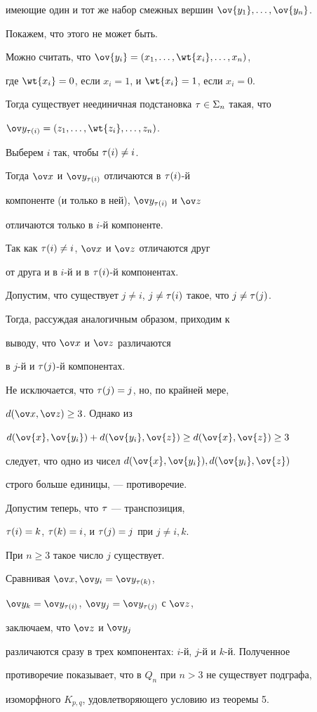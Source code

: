 \begin{exam}
имеющие один и тот же набор смежных вершин $\ov {y_1},\dotsc , \ov {y_n}$.


Покажем, что этого не может быть.


Можно считать, что $\ov{y_i}=(x_1,\dotsc ,\wt {x_i},\dotsc , x_n)$,


где $\wt {x_i}=0$, если $x_i=1$, и $\wt {x_i}=1$, если $x_i=0$.


Тогда существует неединичная подстановка $\tau\in\Sigma_n$ такая, что


$\ov y_{\t (i)}=(z_1,\dotsc ,\wt {z_i},\dotsc , z_n)$. 


Выберем $i$ так, чтобы $\tau (i)\neq i$. 


Тогда $\ov x$ и $\ov y_{\t (i)}$ отличаются в $\tau (i)$-й


компоненте (и только в ней), $\ov y_{\t (i)}$ и $\ov z$ 


отличаются только в $i$-й компоненте.


Так как $\tau (i)\neq i$, $\ov x$ и $\ov z$ отличаются друг 


от друга и в $i$-й и в $\tau (i)$-й компонентах.


Допустим, что существует $j\neq i$, $j\neq \tau (i)$ такое, что $j\neq \tau (j)$.


Тогда, рассуждая аналогичным образом, приходим к 


выводу, что $\ov x$ и $\ov z$ различаются


в $j$-й и $\tau (j)$-й компонентах. 


Не исключается, что $\tau (j)=j$, но, по крайней мере, 


$d(\ov x, \ov z)\geq 3$. Однако из


$d(\ov{x},\ov{y_i})+d(\ov{y_i},\ov{z})\geq d(\ov{x},\ov{z})\geq 3$


следует, что одно из чисел $d(\ov{x},\ov{y_i}), d(\ov{y_i},\ov{z})$


строго больше единицы, --- противоречие.


Допустим теперь, что $\tau$ --- транспозиция, 


$\tau (i)=k$, $\tau (k)=i$, и $\tau (j)=j$ при $j\neq i, k$.


При $n\geq 3$ такое число $j$ существует.


Сравнивая $\ov x, \ov y_i=\ov y_{\t (k)}$,


$\ov y_k=\ov y_{\t (i)}$, $\ov y_j=\ov y_{\t (j)}$ с $\ov z$,


заключаем, что $\ov z$ и $\ov y_j$ 


различаются сразу в трех компонентах: $i$-й, $j$-й и $k$-й. Полученное 


противоречие показывает, что в $Q_n$ при $n>3$ не существует подграфа, 


изоморфного $K_{p, q}$, удовлетворяющего условию из теоремы 5. 


\end{exam}





